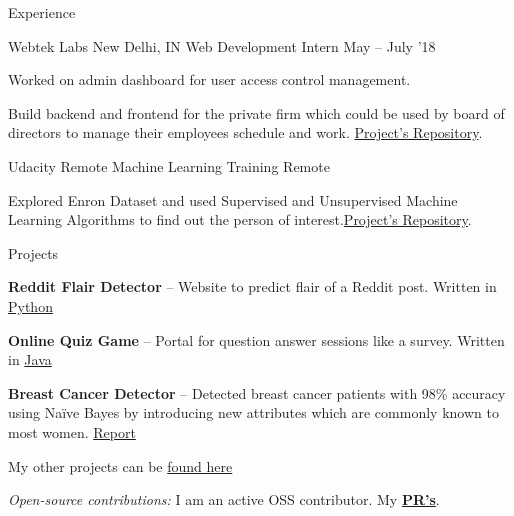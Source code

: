 \documentclass{resume} %
\begin{document}
\begin{rSection}{Experience}
  \begin{rWorkSection}{Webtek Labs}
                           {New Delhi, IN}
                           {Web Development Intern}
                           {May -- July '18}
  {
    \item Worked on admin dashboard for user access control management.
    \item Build backend and frontend for the private firm which could be used by board of directors to manage their employees schedule and work. \href{https://github.com/siddhi523/WebTek}{Project's Repository}.
  }
  \end{rWorkSection}


  \begin{rWorkSection}{Udacity}
                     {Remote}
                     {Machine Learning Training}
                     {Remote}
  {
    \item Explored Enron Dataset and used Supervised and Unsupervised Machine Learning 
          Algorithms to find out the person of interest.\href{https://github.com/siddhi523/ud120-projects}{Project's Repository}.
  }
  \end{rWorkSection}
\end{rSection}


\begin{rSection}{Projects}
  \begin{rProjectSection}
    \item \textbf {Reddit Flair Detector} -- Website to predict flair of a Reddit post. Written in \href{https://github.com/siddhi523/reddit_flair_detector_}{Python}
    \item \textbf {Online Quiz Game} --  Portal for question answer sessions like a survey. Written in \href{https://github.com/siddhi523/Online_Quiz_Game}{Java}
    \item \textbf {Breast Cancer Detector} -- Detected breast cancer patients with 98\% accuracy using Naïve Bayes by introducing new attributes which are commonly known to most women. \href{https://www.semanticscholar.org/paper/Empirical-Analysis-of-Cervical-and-Breast-Cancer-Kaur-Pruthi/28fd7fd826460167a685b29cf3f56cfe83da1cb6}{Report}
    \item My other projects can be \href{https://github.com/siddhi523?tab=repositories}{found here}
  \end{rProjectSection}

  \begin{rBlurbSection}
    \item {\em Open-source contributions:}
      I am an active OSS contributor. My \href{https://github.com/pulls}{\textbf{PR's}}.
  \end{rBlurbSection}
\end{rSection}
\end{document}
